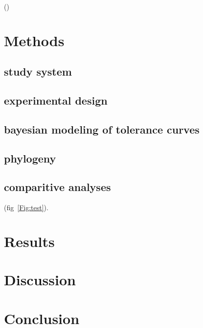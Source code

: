 \documentclass[11pt]{article}
\begin{document}
(\citealt{morrissey_variation_2016})

\section*{Methods}

\subsection*{study system}

\subsection*{experimental design}

\subsection*{bayesian modeling of tolerance curves}

\subsection*{phylogeny}

\subsection*{comparitive analyses}

(fig~\ref{Fig:test}). 

\section*{Results}

\section*{Discussion}

\section*{Conclusion}

\end{document}

